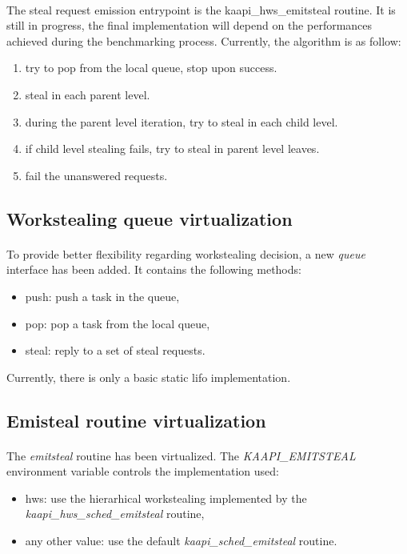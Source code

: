 \documentclass[a4paper, 11pt]{article}
\begin{document}
\paragraph{}
The steal request emission entrypoint is the kaapi\_hws\_emitsteal routine. It
is still in progress, the final implementation will depend on the performances
achieved during the benchmarking process. Currently, the algorithm is as follow:
\begin{enumerate}
\item try to pop from the local queue, stop upon success.
\item steal in each parent level.
\item during the parent level iteration, try to steal in each child level.
\item if child level stealing fails, try to steal in parent level leaves.
\item fail the unanswered requests.
\end{enumerate}

\subsection{Workstealing queue virtualization}
\paragraph{}
To provide better flexibility regarding workstealing decision, a new \textit{queue}
interface has been added. It contains the following methods:
\begin{itemize}
  \item push: push a task in the queue,
  \item pop: pop a task from the local queue,
  \item steal: reply to a set of steal requests.
\end{itemize}
Currently, there is only a basic static lifo implementation.

\subsection{Emisteal routine virtualization}
\paragraph{}
The \textit{emitsteal} routine has been virtualized. The
\textit{KAAPI\_EMITSTEAL} environment variable controls the
implementation used:
\begin{itemize}
\item hws: use the hierarhical workstealing implemented by the
\textit{kaapi\_hws\_sched\_emitsteal} routine,
\item any other value: use the default \textit{kaapi\_sched\_emitsteal} routine.
\end{itemize}
\end{document}
